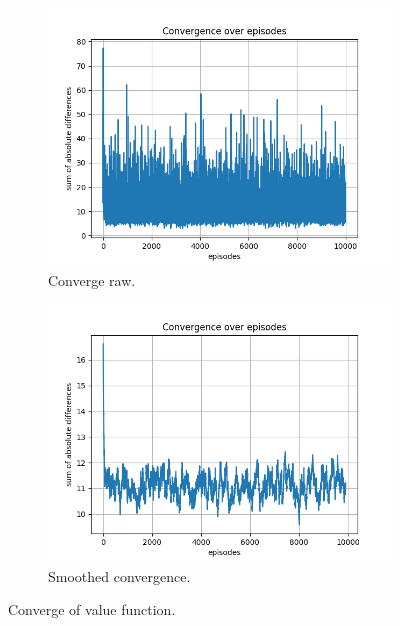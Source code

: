 \documentclass{assignment}
\begin{document}
\begin{figure}[H]
    \begin{subfigure}{0.5\textwidth}
        \includegraphics[width=\textwidth]{figures/convergence_td/epsilon_sweep/convergence_TD_alpha_0.1_gamma_0.95_epislon_1.0.png}
    \caption{Converge raw.}
    \end{subfigure}\hfill
    \begin{subfigure}{0.5\textwidth}
        \includegraphics[width=\textwidth]{figures/convergence_td/epsilon_sweep/convergence_TD_smoothed_alpha_0.1_gamma_0.95_epislon_1.0.png}
    \caption{Smoothed convergence.}
    \end{subfigure}
    \caption{Converge of value function.}
    \label{fig:epsilon_1.0_td_learning_convergence}
\end{figure}
\end{document}
